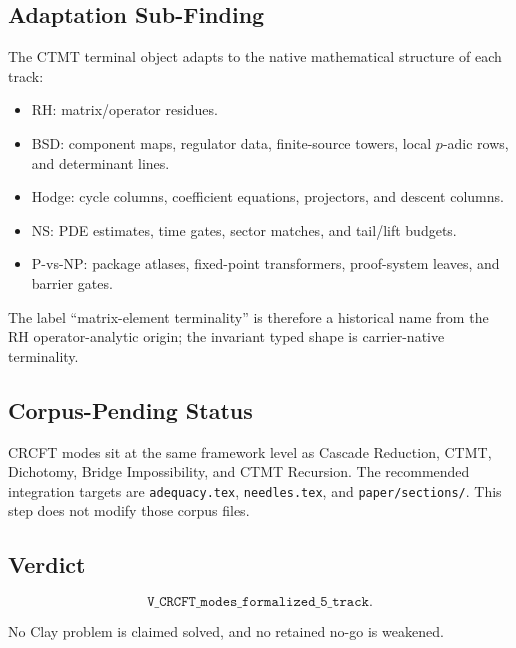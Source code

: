 \subsection*{Adaptation Sub-Finding}

The CTMT terminal object adapts to the native mathematical structure of each track:

\begin{itemize}
  \item RH: matrix/operator residues.
  \item BSD: component maps, regulator data, finite-source towers, local $p$-adic rows, and determinant lines.
  \item Hodge: cycle columns, coefficient equations, projectors, and descent columns.
  \item NS: PDE estimates, time gates, sector matches, and tail/lift budgets.
  \item P-vs-NP: package atlases, fixed-point transformers, proof-system leaves, and barrier gates.
\end{itemize}

The label ``matrix-element terminality'' is therefore a historical name from the RH operator-analytic origin; the invariant typed shape is carrier-native terminality.

\subsection*{Corpus-Pending Status}

CRCFT modes sit at the same framework level as Cascade Reduction, CTMT, Dichotomy, Bridge Impossibility, and CTMT Recursion. The recommended integration targets are \texttt{adequacy.tex}, \texttt{needles.tex}, and \texttt{paper/sections/}. This step does not modify those corpus files.

\subsection*{Verdict}

\[
\texttt{V\_CRCFT\_modes\_formalized\_5\_track}.
\]

No Clay problem is claimed solved, and no retained no-go is weakened.
